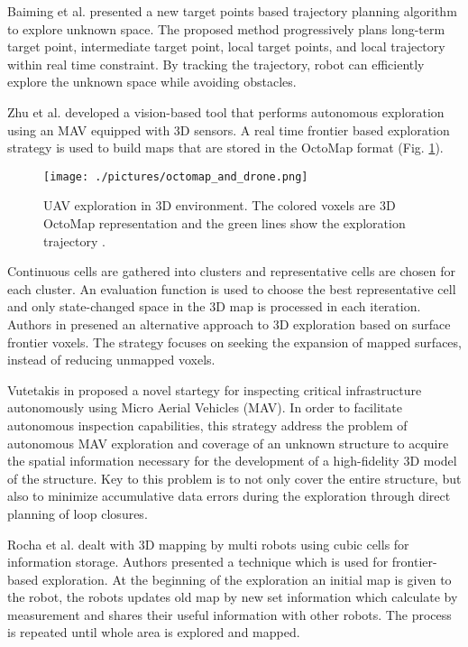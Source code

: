 Baiming et al. \cite{Baiming2018} presented a new target points based trajectory planning algorithm to explore unknown space. The proposed method progressively plans long-term target point, intermediate target point, local target points,
and local trajectory within real time constraint. By tracking the trajectory, robot can efficiently explore the unknown space while avoiding obstacles.

Zhu et al. \cite{Zhu2015} developed a vision-based tool that performs autonomous exploration using an MAV equipped with 3D sensors. A real time frontier based exploration strategy is used to build maps that are stored in the OctoMap format (Fig. \ref{fig:octomap}).

\begin{figure}[t!]
	\centering
	\texttt{[image: ./pictures/octomap\_and\_drone.png]}	
	\caption{UAV exploration in 3D environment. The colored voxels are 3D OctoMap representation and the green lines show the exploration trajectory \cite{Wang2019}.}
	\label{fig:octomap}
\end{figure}

Continuous cells are gathered into clusters and representative cells are chosen for each cluster. An evaluation function is used to choose the best representative cell and only state-changed space in the 3D map is processed in each iteration.
Authors in \cite{Senarathne2016} presened an alternative approach to 3D
exploration based on surface frontier voxels. The strategy focuses on seeking the expansion of mapped surfaces, instead of reducing unmapped voxels. 

Vutetakis in \cite{Vutetakis2019} proposed a novel startegy for inspecting
critical infrastructure autonomously using Micro Aerial Vehicles (MAV). In order to facilitate autonomous inspection capabilities, this strategy address the problem of autonomous MAV exploration and coverage of an unknown structure to acquire the spatial information necessary for the development of a high-fidelity 3D model of the structure. Key to this problem is to not only cover the entire structure, but also to minimize accumulative data errors during the exploration through direct planning of loop closures. 

Rocha et al. \cite{Rocha2005} dealt with 3D mapping by multi robots using cubic cells for information storage. Authors presented a technique which is used for frontier-based exploration. At the beginning of the exploration an initial map is given to the robot, the robots updates old map by new set information which calculate by measurement and shares their useful information with other robots. The process is repeated until whole area is explored and mapped.

